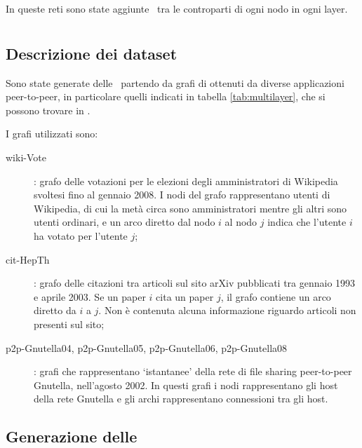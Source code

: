 In queste reti sono state aggiunte \interc\ tra le controparti di ogni nodo in ogni layer.



\section{\Mulns}

\subsection{Descrizione dei dataset}
Sono state generate delle \muln\ partendo da grafi di ottenuti da 
diverse applicazioni peer-to-peer, in particolare quelli 
indicati in tabella \vref{tab:multilayer}, che si possono trovare in \cite{data:multilayer}.

I grafi utilizzati sono:
\begin{description}
    \item[wiki-Vote]: grafo delle votazioni per le elezioni degli amministratori 
    di Wikipedia svoltesi fino al gennaio 2008.
    I nodi del grafo rappresentano utenti di Wikipedia, di cui la metà circa sono 
    amministratori mentre gli altri sono utenti ordinari, e un arco diretto dal nodo 
    $i$ al nodo $j$ indica che l'utente $i$ ha votato per l'utente $j$;

    \item[cit-HepTh]: grafo delle citazioni tra articoli sul sito arXiv
    pubblicati tra gennaio 1993 e aprile 2003.
    Se un paper $i$ cita un paper $j$, il grafo contiene un arco diretto 
    da $i$ a $j$. Non è contenuta alcuna informazione riguardo articoli non 
    presenti sul sito;

    \item[p2p-Gnutella04\textnormal{,} p2p-Gnutella05\textnormal{,} p2p-Gnutella06\textnormal{,} p2p-Gnutella08]: 
    grafi che rappresentano `istantanee' della rete di file sharing peer-to-peer Gnutella, nell'agosto 2002.
    In questi grafi i nodi rappresentano gli host della rete Gnutella e gli archi 
    rappresentano connessioni tra gli host.

\end{description}




\subsection{Generazione delle \mulns}

